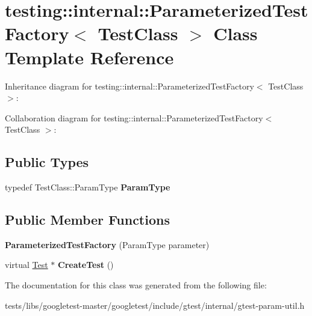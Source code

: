 \hypertarget{classtesting_1_1internal_1_1ParameterizedTestFactory}{}\section{testing\+:\+:internal\+:\+:Parameterized\+Test\+Factory$<$ Test\+Class $>$ Class Template Reference}
\label{classtesting_1_1internal_1_1ParameterizedTestFactory}


Inheritance diagram for testing\+:\+:internal\+:\+:Parameterized\+Test\+Factory$<$ Test\+Class $>$\+:


Collaboration diagram for testing\+:\+:internal\+:\+:Parameterized\+Test\+Factory$<$ Test\+Class $>$\+:
\subsection*{Public Types}
\begin{DoxyCompactItemize}
\item 
\mbox{\label{classtesting_1_1internal_1_1ParameterizedTestFactory_ad9a27b8e1a83de2f1687625bccff460d}} 
typedef Test\+Class\+::\+Param\+Type {\bfseries Param\+Type}
\end{DoxyCompactItemize}
\subsection*{Public Member Functions}
\begin{DoxyCompactItemize}
\item 
\mbox{\label{classtesting_1_1internal_1_1ParameterizedTestFactory_a82d78356cd402224255edec760a048fb}} 
{\bfseries Parameterized\+Test\+Factory} (Param\+Type parameter)
\item 
\mbox{\label{classtesting_1_1internal_1_1ParameterizedTestFactory_ae17e73e91f7fd5d49ca238c005ef4960}} 
virtual \hyperlink{classtesting_1_1Test}{Test} $\ast$ {\bfseries Create\+Test} ()
\end{DoxyCompactItemize}


The documentation for this class was generated from the following file\+:\begin{DoxyCompactItemize}
\item 
tests/libs/googletest-\/master/googletest/include/gtest/internal/gtest-\/param-\/util.\+h\end{DoxyCompactItemize}
